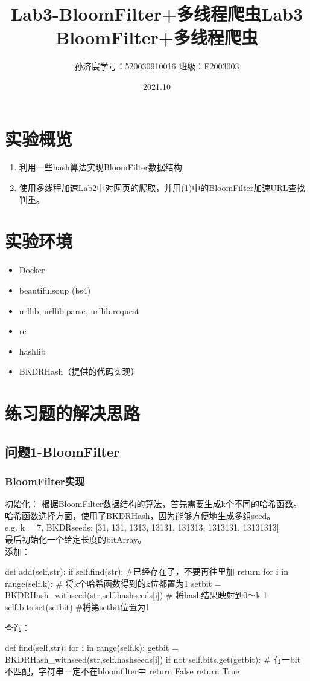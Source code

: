 \documentclass[12pt,a4paper]{article}
\title{Lab3-BloomFilter+多线程爬虫}
\title{Lab3 \quad BloomFilter+多线程爬虫}
\date{2021.10}
\author{孙济宸\quad \quad 学号：520030910016 \quad  \quad 班级：F2003003}
\begin{document}
\maketitle
\section{实验概览}
\begin{enumerate}
	\item 利用一些hash算法实现BloomFilter数据结构
	\item 使用多线程加速Lab2中对网页的爬取，并用(1)中的BloomFilter加速URL查找判重。
\end{enumerate}
\section{实验环境}
\begin{itemize}
	\item Docker
	\item beautifulsoup (bs4)
	\item urllib, urllib.parse, urllib.request
	\item re
	\item hashlib
	\item BKDRHash（提供的代码实现）
\end{itemize}
\newpage

\section{练习题的解决思路}
\subsection{问题1-BloomFilter}
\subsubsection{BloomFilter实现}
初始化：
根据BloomFilter数据结构的算法，首先需要生成k个不同的哈希函数。
哈希函数选择方面，使用了BKDRHash，因为能够方便地生成多组seed。
\\ e.g. k = 7,  BKDRseeds: [31, 131, 1313, 13131, 131313, 1313131, 13131313]\\
最后初始化一个给定长度的bitArray。\\
添加：
\begin{python}
def add(self,str):
        if self.find(str):  #已经存在了，不要再往里加
            return
        for i in range(self.k):     # 将k个哈希函数得到的k位都置为1
            setbit = BKDRHash_withseed(str,self.hashseeds[i]) %
            # 将hash结果映射到0～k-1
            self.bits.set(setbit)	 #将第setbit位置为1
\end{python}
查询：
\begin{python} 
    def find(self,str):
        for i in range(self.k):
            getbit = BKDRHash_withseed(str,self.hashseeds[i]) %
            if not self.bits.get(getbit):  
            # 有一bit不匹配，字符串一定不在bloomfilter中
                return False
        return True 
\end{python}
\end{document}
